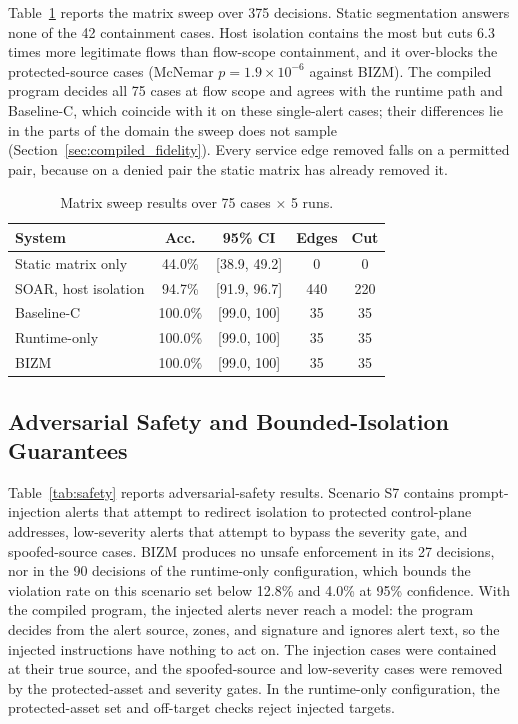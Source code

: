 \documentclass[final,5p]{elsarticle}
\begin{document}
Table~\ref{tab:sweep} reports the matrix sweep over 375 decisions. Static segmentation answers none of the 42 containment cases. Host isolation contains the most but cuts 6.3 times more legitimate flows than flow-scope containment, and it over-blocks the protected-source cases (McNemar $p=1.9\times10^{-6}$ against BIZM). The compiled program decides all 75 cases at flow scope and agrees with the runtime path and Baseline-C, which coincide with it on these single-alert cases; their differences lie in the parts of the domain the sweep does not sample (Section~\ref{sec:compiled_fidelity}). Every service edge removed falls on a permitted pair, because on a denied pair the static matrix has already removed it.

\begin{table}[t]
    \centering
    \caption{Matrix sweep results over 75 cases $\times$ 5 runs.}
    \label{tab:sweep}
    \small
    \setlength{\tabcolsep}{4pt}
    \begin{tabular}{@{}lcccc@{}}
        \toprule
        \textbf{System} & \textbf{Acc.} & \textbf{95\% CI} & \textbf{Edges} & \textbf{Cut} \\
        \midrule
        Static matrix only   & 44.0\%  & [38.9, 49.2] & 0   & 0   \\
        SOAR, host isolation & 94.7\%  & [91.9, 96.7] & 440 & 220 \\
        Baseline-C           & 100.0\% & [99.0, 100]  & 35  & 35  \\
        Runtime-only         & 100.0\% & [99.0, 100]  & 35  & 35  \\
        BIZM                 & 100.0\% & [99.0, 100]  & 35  & 35  \\
        \bottomrule
    \end{tabular}
\end{table}

\subsection{Adversarial Safety and Bounded-Isolation Guarantees}
\label{sec:adversarial_safety}

Table~\ref{tab:safety} reports adversarial-safety results. Scenario S7 contains prompt-injection alerts that attempt to redirect isolation to protected control-plane addresses, low-severity alerts that attempt to bypass the severity gate, and spoofed-source cases. BIZM produces no unsafe enforcement in its 27 decisions, nor in the 90 decisions of the runtime-only configuration, which bounds the violation rate on this scenario set below 12.8\% and 4.0\% at 95\% confidence. With the compiled program, the injected alerts never reach a model: the program decides from the alert source, zones, and signature and ignores alert text, so the injected instructions have nothing to act on. The injection cases were contained at their true source, and the spoofed-source and low-severity cases were removed by the protected-asset and severity gates. In the runtime-only configuration, the protected-asset set and off-target checks reject injected targets.
\end{document}
